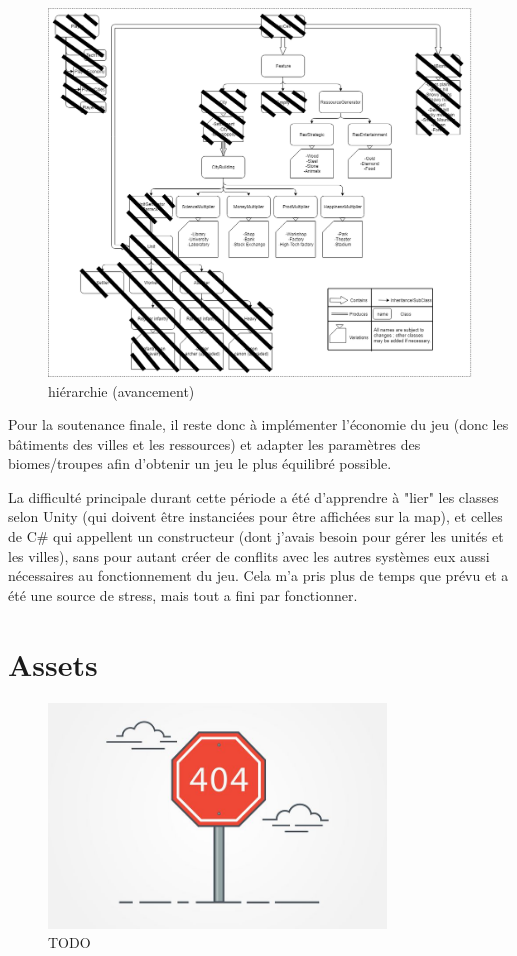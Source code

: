 \documentclass[12pt]{report}
\begin{document}
\begin{figure}[H]
    \centering
    \includegraphics[width=1\textwidth]{class_hierarchy}
    \caption{hiérarchie (avancement)}
\end{figure}

Pour la soutenance finale, il reste donc à implémenter l’économie du jeu (donc les bâtiments des villes et les ressources) et adapter les paramètres des biomes/troupes afin d’obtenir un jeu le plus équilibré possible.

La difficulté principale durant cette période a été d'apprendre à "lier" les classes selon Unity (qui doivent être instanciées pour être affichées sur la map), et celles de C\# qui appellent un constructeur (dont j'avais besoin pour gérer les unités et les villes), sans pour autant créer de conflits avec les autres systèmes eux aussi nécessaires au fonctionnement du jeu. Cela m'a pris plus de temps que prévu et a été une source de stress, mais tout a fini par fonctionner.

\section*{Assets}

\begin{figure}[H]
    \centering
    \includegraphics[width=0.8\textwidth]{404}
    \caption{TODO}
\end{figure}
\end{document}
